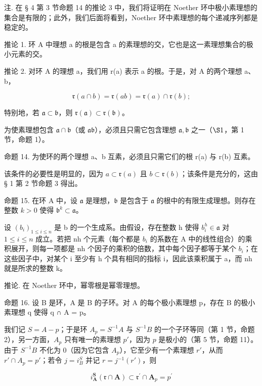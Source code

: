 注. 在 § 4 第 3 节命题 14 的推论 3 中，我们将证明在 Noether 环中极小素理想的集合是有限的；此外，我们后面将看到，Noether 环中素理想的每个递减序列都是稳定的。

推论 1. 环 A 中理想 a 的根是包含 a 的素理想的交，它也是这一素理想集合的极小元素的交。

推论 2. 对环 A 的理想 a，我们用 r(a) 表示 a 的根。于是，对 A 的两个理想 a、b，

\[
\mathfrak {r} (a \cap b) = \mathfrak {r} (a b) = \mathfrak {r} (a) \cap \mathfrak {r} (b);
\]

特别地，若 \(\mathfrak{a} \subset \mathfrak{b}\)，则 \(\mathfrak{r}(\mathfrak{a}) \subset \mathfrak{r}(\mathfrak{b})\)。

为使素理想包含 \(\mathfrak{a} \cap \mathfrak{b}\)（或 \(\mathfrak{ab}\)），必须且只需它包含理想 \(\mathfrak{a}, \mathfrak{b}\) 之一（\(\S 1\)，第 1 节，命题 1）。

命题 14. 为使环的两个理想 a、b 互素，必须且只需它们的根 r(a) 与 r(b) 互素。

该条件的必要性是明显的，因为 \(a \subset \mathfrak{r}(a)\) 且 \(b \subset \mathfrak{r}(b)\)；该条件是充分的，这由 § 1 第 2 节命题 3 得出。

命题 15. 在环 A 中，设 \(\mathfrak{a}\) 是理想，\(\mathfrak{b}\) 是包含于 \(\mathfrak{a}\) 的根中的有限生成理想。则存在整数 \(k > 0\) 使得 \(\mathfrak{b}^k \subset \mathfrak{a}\)。

设 \((b_{i})_{1\leqslant i\leqslant n}\) 是 b 的一个生成系。由假设，存在整数 h 使得 \(b_{i}^{h}\in\mathfrak{a}\) 对 \(1\leqslant i\leqslant n\) 成立。若把 nh 个元素（每个都是 \(b_{i}\) 的系数在 A 中的线性组合）的乘积展开，则每一项都是 nh 个因子的乘积的倍数，其中每个因子都等于某个 \(b_{i}\)；在这些因子中，对某个 i 至少有 h 个具有相同的指标 i，因此该乘积属于 a，而 nh 就是所求的整数 k。

推论. 在 Noether 环中，幂零根是幂零理想。

命题 16. 设 B 是环，A 是 B 的子环。对 A 的每个极小素理想 p，存在 B 的极小素理想 q 使得 q ∩ A = p。

我们记 \(S = A - p\)；于是环 \(A_p = S^{-1}A\) 与 \(S^{-1}B\) 的一个子环等同（第 1 节，命题 2），另一方面，\(A_p\) 只有唯一的素理想 \(p'\)，因为 \(p\) 是极小的（第 5 节，命题 11）。由于 \(S^{-1}B\) 不化为 0（因为它包含 \(A_p\)），它至少有一个素理想 \(r'\)，从而 \(r' \cap A_p = p'\)；若令 \(j = i_B^S\) 并记 \(r = j^{-1}(r')\)，则

\[
i _ {\mathbf {A}} ^ {\mathbf {S}} (\mathfrak {r} \cap \mathbf {A}) \subset \mathfrak {r} ^ {\prime} \cap \mathbf {A} _ {p} = p ^ {\prime}
\]

